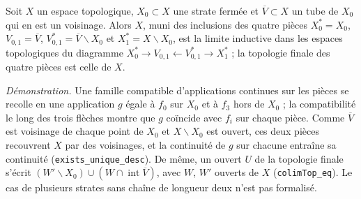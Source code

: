 \begin{encadre}
\begin{theoreme*}
Soit $X$ un espace topologique, $X_0 \subset X$ une strate fermée et $\overline V \subset X$ un tube de $X_0$ qui en est un voisinage. Alors $X$, muni des inclusions des quatre pièces $X_0^* = X_0$, $V_{0,1} = \overline V$, $V^*_{0,1} = \overline V \smallsetminus X_0$ et $X_1^* = X \smallsetminus X_0$, est la limite inductive dans les espaces topologiques du diagramme $X_0^* \to V_{0,1} \leftarrow V^*_{0,1} \to X_1^*$ ; la topologie finale des quatre pièces est celle de $X$.
\end{theoreme*}
\end{encadre}
{\small \emph{Démonstration.} Une famille compatible d'applications continues sur les pièces se recolle en une application $g$ égale à $f_0$ sur $X_0$ et à $f_3$ hors de $X_0$ ; la compatibilité le long des trois flèches montre que $g$ coïncide avec $f_i$ sur chaque pièce. Comme $\overline V$ est voisinage de chaque point de $X_0$ et $X \smallsetminus X_0$ est ouvert, ces deux pièces recouvrent $X$ par des voisinages, et la continuité de $g$ sur chacune entraîne sa continuité (\texttt{exists\_unique\_desc}). De même, un ouvert $U$ de la topologie finale s'écrit $(W' \smallsetminus X_0) \cup (W \cap \operatorname{int}\overline V)$, avec $W$, $W'$ ouverts de $X$ (\texttt{colimTop\_eq}). Le cas de plusieurs strates sans chaîne de longueur deux n'est pas formalisé.\par}
